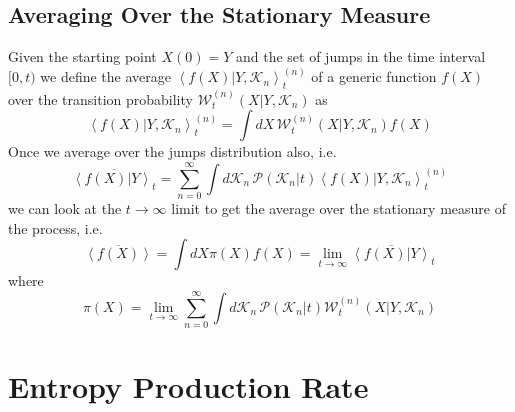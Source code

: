 \documentclass[12pt]{iopart}
\newcommand{\lx} {\left}
\newcommand{\rx} {\right}
\newcommand{\ave}[1] {\lx\langle #1 \rx\rangle}
\newcommand{\cP} {\mathcal{P}}
\newcommand{\cW} {\mathcal{W}}
\newcommand{\cK} {\mathcal{K}}
\begin{document}
\subsection{Averaging Over the Stationary Measure}
Given the starting point $X(0)=Y$ and the set of jumps in the time interval $[0,t)$ we define the average $\ave{f(X)|Y,\cK_n}^{(n)}_t$ of a generic function $f(X)$ over the transition probability $\cW^{(n)}_t(X|Y,\cK_n)$ as
\begin{equation}
\ave{f(X)|Y,\cK_n}^{(n)}_t = \int dX\, \cW^{(n)}_t(X|Y,\cK_n) f(X)
\end{equation}
Once we average over the jumps distribution also, i.e.
\begin{equation}
\overline{\ave{f(X)|Y}_t} = \sum_{n=0}^\infty \int d\cK_n\, \cP(\cK_n|t) \ave{f(X)|Y,\cK_n}^{(n)}_t
\end{equation}
we can look at the $t\to\infty$ limit to get the average over the stationary measure of the process, i.e.
\begin{equation}
 \overline{\ave{f(X)}} = \int dX \pi(X) f(X) = \lim_{t\to\infty} \overline{\ave{f(X)|Y}}_t
 \end{equation}
where
\begin{equation}
    \pi(X) = \lim_{t\to\infty} \sum_{n=0}^\infty \int d\cK_n\, \cP(\cK_n|t)  \cW^{(n)}_t(X|Y,\cK_n)
\end{equation}
\section{Entropy Production Rate}\label{appendix:EPR}
\end{document}
